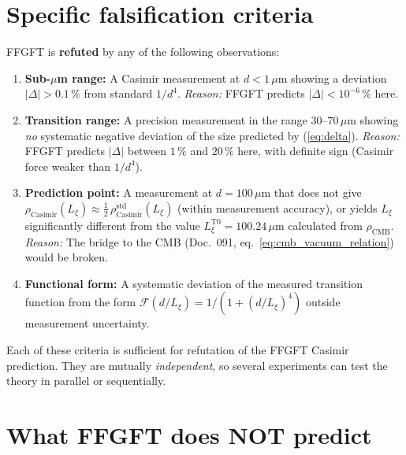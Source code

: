 \section{Specific falsification criteria}

FFGFT is \textbf{refuted} by any of the following observations:

\begin{enumerate}[leftmargin=2em,itemsep=4pt,topsep=2pt]
  \item \textbf{Sub-$\mu$m range:}
        A Casimir measurement at $d < 1\,\mu$m showing a deviation
        $|\Delta| > 0.1\,\%$ from standard $1/d^4$.
        \emph{Reason:} FFGFT predicts $|\Delta| < 10^{-6}\,\%$ here.

  \item \textbf{Transition range:}
        A precision measurement in the range $30$--$70\,\mu$m
        showing \emph{no} systematic negative deviation of the size
        predicted by (\ref{eq:delta}).
        \emph{Reason:} FFGFT predicts $|\Delta|$ between $1\,\%$ and
        $20\,\%$ here, with definite sign (Casimir force weaker than
        $1/d^4$).

  \item \textbf{Prediction point:}
        A measurement at $d = 100\,\mu$m that does not give
        $\rho_\text{Casimir}(L_\xi) \approx \frac{1}{2}\,
        \rho_\text{Casimir}^\text{std}(L_\xi)$ (within measurement
        accuracy), or yields $L_\xi$ significantly different from
        the value $L_\xi^\text{T0} = 100.24\,\mu$m calculated from
        $\rho_\text{CMB}$.
        \emph{Reason:} The bridge to the CMB (Doc.~091,
        eq.~\ref{eq:cmb_vacuum_relation}) would be broken.

  \item \textbf{Functional form:}
        A systematic deviation of the measured transition function
        from the form $\mathcal{F}(d/L_\xi) = 1/(1 + (d/L_\xi)^4)$
        outside measurement uncertainty.
\end{enumerate}

Each of these criteria is sufficient for refutation of the FFGFT
Casimir prediction. They are mutually \emph{independent}, so
several experiments can test the theory in parallel or sequentially.

\section{What FFGFT does NOT predict}


